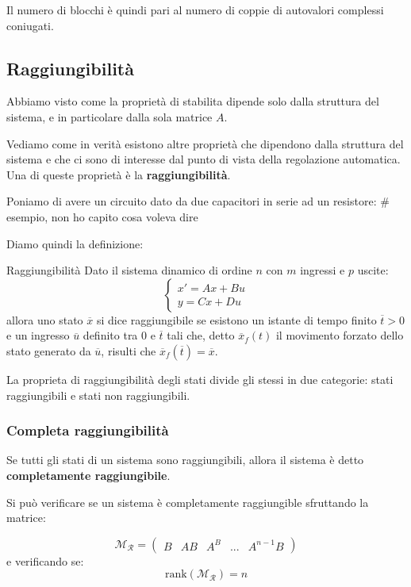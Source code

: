 \documentclass[a4paper,11pt]{article}
\begin{document}
Il numero di blocchi è quindi pari al numero di coppie di autovalori complessi coniugati.

\subsection{Raggiungibilità}
Abbiamo visto come la proprietà di stabilita dipende solo dalla struttura del sistema, e in particolare dalla sola matrice $A$.

Vediamo come in verità esistono altre proprietà che dipendono dalla struttura del sistema e che ci sono di interesse dal punto di vista della regolazione automatica.
Una di queste proprietà è la \textbf{raggiungibilità}.

Poniamo di avere un circuito dato da due capacitori in serie ad un resistore:
# esempio, non ho capito cosa voleva dire

Diamo quindi la definizione:
\begin{definition}{Raggiungibilità}
	Dato il sistema dinamico di ordine $n$ con $m$ ingressi e $p$ uscite:
	\[
		\begin{cases}
			x' = Ax + Bu \\
			y = Cx + Du
		\end{cases}
	\]
		allora uno stato $\overline{x}$ si dice raggiungibile se esistono un istante di tempo finito $\overline{t} > 0$ e un ingresso $\overline{u}$ definito tra $0$ e $\overline{t}$ tali che, detto $\overline{x}_f(t)$ il movimento forzato dello stato generato da $\overline{u}$, risulti che $\overline{x}_f(\overline{t}) = \overline{x}$.
\end{definition}

La proprieta di raggiungibilità degli stati divide gli stessi in due categorie: stati raggiungibili e stati non raggiungibili.

\subsubsection{Completa raggiungibilità}
Se tutti gli stati di un sistema sono raggiungibili, allora il sistema è detto \textbf{completamente raggiungibile}.

Si può verificare se un sistema è completamente raggiungible sfruttando la matrice:

$$
\mathcal{M}_\mathcal{R} = \begin{pmatrix}
	B & AB & A^B & ... & A^{n - 1}B
\end{pmatrix}
$$
e verificando se:
$$
\mathrm{rank}(\mathcal{M}_\mathcal{R}) = n
$$
\end{document}

